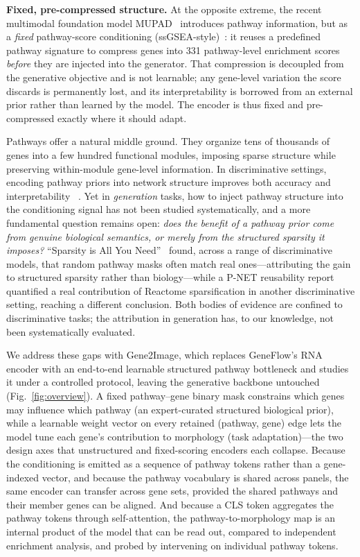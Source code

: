 \documentclass[journal]{IEEEtran}
\newcommand{\method}{Gene2Image}
\begin{document}
\textbf{Fixed, pre-compressed structure.} At the opposite extreme, the recent
multimodal foundation model MUPAD~\cite{mupad} introduces pathway information, but
as a \emph{fixed} pathway-score conditioning (ssGSEA-style)~\cite{ssgsea}: it reuses a predefined
pathway signature to compress genes into 331 pathway-level enrichment scores \emph{before} they
are injected into the generator. That compression is decoupled from the
generative objective and is not learnable; any gene-level variation the score
discards is permanently lost, and its interpretability is borrowed from an
external prior rather than learned by the model. The encoder is thus fixed and
pre-compressed exactly where it should adapt.

Pathways offer a natural middle ground. They organize tens of thousands of genes
into a few hundred functional modules, imposing sparse structure while preserving
within-module gene-level information. In discriminative settings, encoding
pathway priors into network structure improves both accuracy and interpretability
~\cite{pnet,survpath,tosica}. Yet in \emph{generation} tasks, how to inject
pathway structure into the conditioning signal has not been studied
systematically, and a more fundamental question remains open: \emph{does the
benefit of a pathway prior come from genuine biological semantics, or merely from
the structured sparsity it imposes?} ``Sparsity is All You Need''~\cite{sparsity}
found, across a range of discriminative models, that random pathway masks often match
real ones---attributing the gain to structured sparsity rather than biology---while
a P-NET reusability report~\cite{pnet_repro} quantified a real contribution
of Reactome sparsification in another discriminative setting, reaching a different
conclusion. Both bodies of
evidence are confined to discriminative tasks; the attribution in generation
has, to our knowledge, not been systematically evaluated.

We address these gaps with \method, which replaces GeneFlow's RNA encoder with an
end-to-end learnable structured pathway bottleneck and studies it under a
controlled protocol, leaving the generative backbone untouched
(Fig.~\ref{fig:overview}). A fixed pathway--gene
binary mask constrains which genes may influence which pathway (an expert-curated
structured biological prior), while a learnable weight vector on every retained (pathway, gene) edge
lets the model tune each gene's contribution to morphology (task adaptation)---the
two design axes that unstructured and fixed-scoring encoders each collapse. Because
the conditioning is emitted as a sequence of pathway tokens rather than a
gene-indexed vector, and because the pathway vocabulary is shared across panels,
the same encoder can transfer across gene sets, provided the shared pathways and
their member genes can be aligned. And because a CLS token aggregates the
pathway tokens through self-attention, the pathway-to-morphology map is an internal
product of the model that can be read out, compared to independent enrichment
analysis, and probed by intervening on individual pathway tokens.
\end{document}
